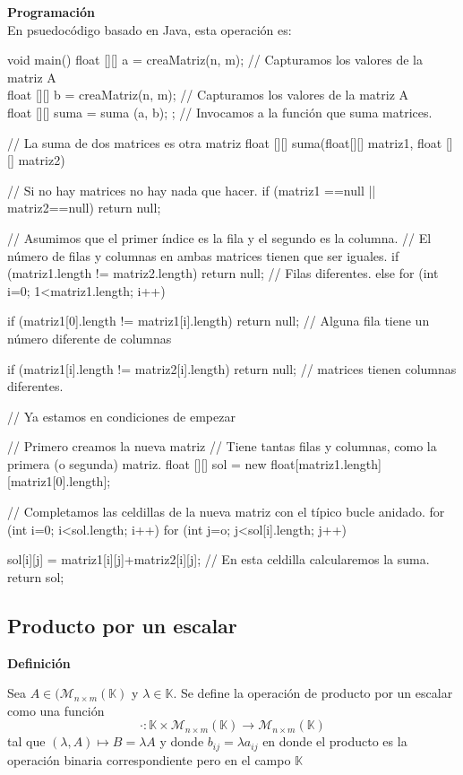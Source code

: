 \noindent\textbf{Programación} \\

En psuedocódigo basado en Java, esta operación es:
\begin{code}[caption=Suma de Matrices, label=default]
void main() {
  float [][] a = creaMatriz(n, m); // Capturamos los valores de la matriz A \\
  float [][] b = creaMatriz(n, m); // Capturamos los valores de la matriz A \\
  float [][] suma = suma (a, b); ; // Invocamos a la función que suma matrices. \\
} 

// La suma de dos matrices es otra matriz
float [][] suma(float[][] matriz1, float [][] matriz2) {
   // Si no hay matrices no hay nada que hacer.
   if (matriz1 ==null || matriz2==null) return null;
   
   // Asumimos que el primer índice es la fila y el segundo es la columna.
   // El número de filas y columnas en ambas matrices tienen que ser iguales.
   if (matriz1.length != matriz2.length) return null; // Filas diferentes.
   else
     for (int i=0; 1<matriz1.length; i++) {
       if (matriz1[0].length != matriz1[i].length) 
         return null; // Alguna fila tiene un número diferente de columnas
         
       if (matriz1[i].length != matriz2[i].length)
         return null; //  matrices tienen columnas diferentes.
     }
   // Ya estamos en condiciones de empezar
   
   // Primero creamos la nueva matriz
   // Tiene tantas filas y columnas, como la primera (o segunda) matriz.
   float [][] sol = new float[matriz1.length][matriz1[0].length];
   
   // Completamos las celdillas de la nueva matriz con el típico bucle anidado.
   for (int i=0; i<sol.length; i++)
     for (int j=o; j<sol[i].length; j++)
     
       sol[i][j] = matriz1[i][j]+matriz2[i][j]; // En esta celdilla calcularemos la suma.
   return sol;
}    
\end{code}

\subsection{Producto por un escalar}

\noindent\textbf{Definición}

Sea $A \in (\mathcal{M}_{n\times {m}}(\mathbb{K})$ y $\lambda \in \mathbb{K}$. Se define la operación de producto por un escalar como una función  
$$
\cdot : \mathbb{K} \times \mathcal{M}_{n\times {m}}(\mathbb{K}) \longrightarrow \mathcal{M}_{n\times {m}}(\mathbb{K})
$$
tal que $(\lambda, A) \mapsto B = \lambda A$ y donde $b_{ij} = \lambda a_{ij}$ en donde el producto es la operación binaria correspondiente pero en el campo $\mathbb{K}$ \\

